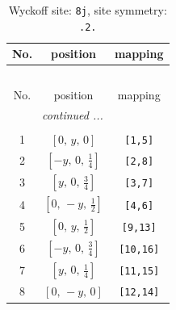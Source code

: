 \documentclass[fleqn,8pt]{jsarticle}
\begin{document}
\begin{longtable}{ccc}
\caption{Wyckoff site: {\tt 8j}, site symmetry: {\tt .2.}}
 \\
 \hline \hline
No. & position & mapping \\ \hline \endfirsthead

\multicolumn{2}{l}{\tablename\ \thetable{}} \\
 \hline \hline
No. & position & mapping \\ \hline \endhead

 \hline \hline
\multicolumn{2}{r}{\footnotesize\it continued ...} \\ \endfoot

 \hline \hline
\multicolumn{2}{r}{} \\ \endlastfoot

1 & $\left[ 0,\, y,\, 0 \right]$ & {\tt [1,5]} \\ \hline
2 & $\left[ - y,\, 0,\, \frac{1}{4} \right]$ & {\tt [2,8]} \\ \hline
3 & $\left[ y,\, 0,\, \frac{3}{4} \right]$ & {\tt [3,7]} \\ \hline
4 & $\left[ 0,\, - y,\, \frac{1}{2} \right]$ & {\tt [4,6]} \\ \hline
5 & $\left[ 0,\, y,\, \frac{1}{2} \right]$ & {\tt [9,13]} \\ \hline
6 & $\left[ - y,\, 0,\, \frac{3}{4} \right]$ & {\tt [10,16]} \\ \hline
7 & $\left[ y,\, 0,\, \frac{1}{4} \right]$ & {\tt [11,15]} \\ \hline
8 & $\left[ 0,\, - y,\, 0 \right]$ & {\tt [12,14]} \\
\end{longtable}
\renewcommand{\arraystretch}{1.2}
\end{document}
